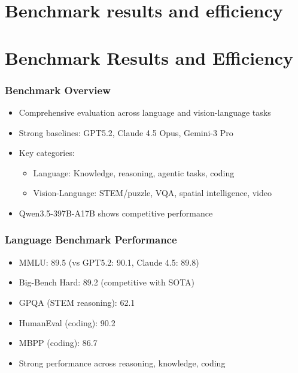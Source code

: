 \section{Benchmark results and efficiency}%
\section{Benchmark Results and Efficiency}%
\begin{frame}

\frametitle{Benchmark Overview}

\begin{itemize}
\item Comprehensive evaluation across language and vision-language tasks
\item Strong baselines: GPT5.2, Claude 4.5 Opus, Gemini-3 Pro
\item Key categories:
  \begin{itemize}
  \item Language: Knowledge, reasoning, agentic tasks, coding
  \item Vision-Language: STEM/puzzle, VQA, spatial intelligence, video
  \end{itemize}
\item Qwen3.5-397B-A17B shows competitive performance
\end{itemize}
\end{frame}%
\begin{frame}

\frametitle{Language Benchmark Performance}

\begin{itemize}
\item MMLU: 89.5 (vs GPT5.2: 90.1, Claude 4.5: 89.8)
\item Big-Bench Hard: 89.2 (competitive with SOTA)
\item GPQA (STEM reasoning): 62.1
\item HumanEval (coding): 90.2
\item MBPP (coding): 86.7
\item Strong performance across reasoning, knowledge, coding
\end{itemize}
\end{frame}%
